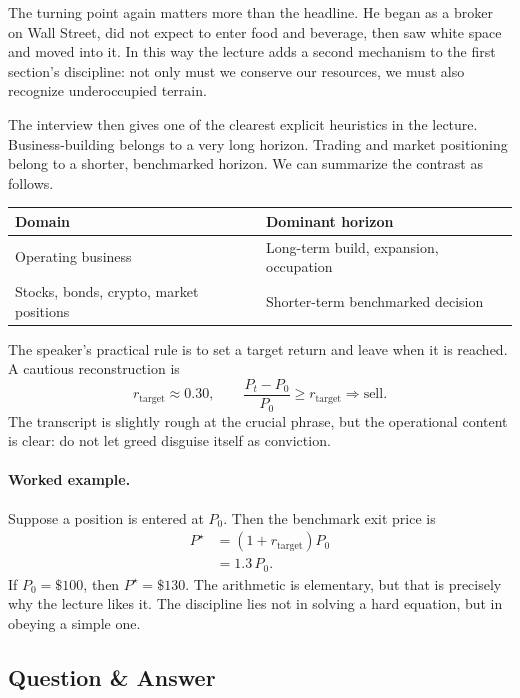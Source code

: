 The turning point again matters more than the headline. He began as a broker on Wall Street, did not expect to enter food and beverage, then saw white space and moved into it. In this way the lecture adds a second mechanism to the first section's discipline: not only must we conserve our resources, we must also recognize underoccupied terrain.

The interview then gives one of the clearest explicit heuristics in the lecture. Business-building belongs to a very long horizon. Trading and market positioning belong to a shorter, benchmarked horizon. We can summarize the contrast as follows.

\begin{table}
\centering
\begin{tabular}{|l|l|}
\hline
Domain & Dominant horizon \\
\hline
Operating business & Long-term build, expansion, occupation \\
Stocks, bonds, crypto, market positions & Shorter-term benchmarked decision \\
\hline
\end{tabular}
\end{table}

The speaker's practical rule is to set a target return and leave when it is reached. A cautious reconstruction is
\begin{equation}
r_{\text{target}} \approx 0.30,
\qquad
\frac{P_t-P_0}{P_0} \ge r_{\text{target}}
\Longrightarrow
\text{sell}.
\end{equation}
The transcript is slightly rough at the crucial phrase, but the operational content is clear: do not let greed disguise itself as conviction.

\paragraph{Worked example.} Suppose a position is entered at \(P_0\). Then the benchmark exit price is
\begin{align}
P^\star &= (1+r_{\text{target}})P_0 \\
&= 1.3\,P_0.
\end{align}
If \(P_0=\$100\), then \(P^\star=\$130\). The arithmetic is elementary, but that is precisely why the lecture likes it. The discipline lies not in solving a hard equation, but in obeying a simple one.

\subsection{Question \& Answer}

